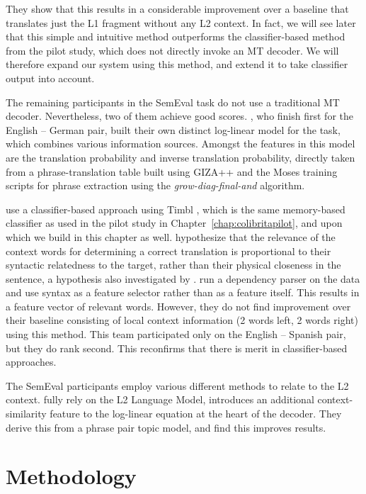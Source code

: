 They show that this results in a considerable improvement over a baseline that
translates just the L1 fragment without any L2 context. In fact, we will see
later that this simple and intuitive method outperforms the
classifier-based method from the pilot study, which does not directly invoke
an MT decoder. We will therefore expand our system using this method, and
extend it to take classifier output into account.

The remaining participants in the SemEval task do not use a
traditional MT decoder. Nevertheless, two of them achieve good scores.
\cite{IUCL}, who finish first for the English -- German pair, built
their own distinct log-linear model for the task, which combines
various information sources. Amongst the features in this model are
the translation probability and inverse translation probability,
directly taken from a phrase-translation table built using GIZA++
\citep{GIZA} and the Moses training scripts for phrase extraction
using the {\em grow-diag-final-and}\/ algorithm.

\cite{UNAL} use a classifier-based approach using Timbl \citep{TIMBL},
which is the same memory-based classifier as used in the pilot study in Chapter~\ref{chap:colibritapilot},
and upon which we build in this chapter as well. \cite{UNAL} hypothesize that the
relevance of the context words for determining a correct translation
is proportional to their syntactic relatedness to the target, rather
than their physical closeness in the sentence, a hypothesis also
investigated by \cite{Haque+11}. \cite{UNAL} run a dependency parser
on the data and use syntax as a feature selector rather than as a
feature itself. This results in a feature vector of relevant
words. However, they do not find improvement over their baseline consisting of
local context information (2 words left, 2 words right) using this
method. This team participated only on the English -- Spanish pair,
but they do rank second. This reconfirms that there is merit in
classifier-based approaches.

The SemEval participants employ various different methods to relate to
the L2 context. \cite{CNRC} fully rely on the L2 Language Model,
\cite{UEDIN} introduces an additional context-similarity feature to
the log-linear equation at the heart of the decoder. They derive this
from a phrase pair topic model, and find this improves results.


\section{Methodology}
\label{methodology}

